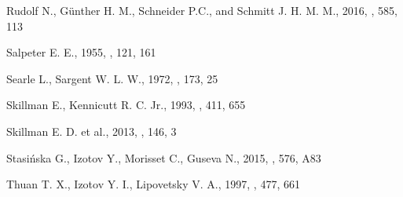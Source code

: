 \begin{thebibliography}{}
 Rudolf N., G\"unther H. M., Schneider P.C., and Schmitt J. H. M. M., 2016, \aap, 585, 113

 Salpeter E. E., 1955, \apj, 121, 161




 Searle L., Sargent W. L. W., 1972,
\apj, 173, 25


 Skillman E., Kennicutt R. C. Jr.,
 1993, \apj, 411, 655

 Skillman E. D. et al., 2013, \aj, 146, 3


 Stasi\'nska G., Izotov Y., 
Morisset C.,  Guseva N., 2015, \aap, 576, A83






 Thuan T. X., 
Izotov Y. I., Lipovetsky V. A., 1997, \apj, 477, 661



\end{thebibliography}
